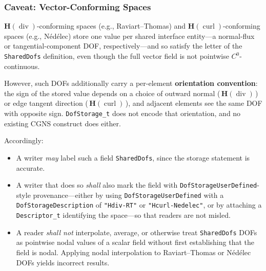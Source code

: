 \documentclass[11pt,letterpaper]{article}
\begin{document}
\subsubsection{Caveat: Vector-Conforming Spaces}
\label{sec:hdiv-hcurl}

$\boldsymbol{H}(\operatorname{div})$-conforming spaces
(e.g., Raviart--Thomas) and $\boldsymbol{H}(\operatorname{curl})$-conforming spaces
(e.g., N\'{e}d\'{e}lec) store one value per shared interface entity---a normal-flux
or tangential-component DOF, respectively---and so satisfy the letter of the
\texttt{SharedDofs} definition, even though the full vector field is not
pointwise $C^0$-continuous.

However, such DOFs additionally carry a per-element \textbf{orientation
convention}: the sign of the stored value depends on a choice of outward
normal (\,$\boldsymbol{H}(\operatorname{div})$\,) or edge tangent direction
(\,$\boldsymbol{H}(\operatorname{curl})$\,), and adjacent elements see the same
DOF with opposite sign.  \texttt{DofStorage\_t} does not encode that
orientation, and no existing CGNS construct does either.

Accordingly:

\begin{itemize}[leftmargin=2em]
\item A writer \emph{may} label such a field \texttt{SharedDofs}, since the
  storage statement is accurate.
\item A writer that does so \emph{shall} also mark the field with
  \texttt{DofStorageUserDefined}-style provenance---either by using
  \texttt{DofStorageUserDefined} with a
  \texttt{DofStorageDescription} of \texttt{"Hdiv-RT"} or
  \texttt{"Hcurl-Nedelec"}, or by attaching a
  \texttt{Descriptor\_t} identifying the space---so that readers are not
  misled.
\item A reader \emph{shall not} interpolate, average, or otherwise treat
  \texttt{SharedDofs} DOFs as pointwise nodal values of a scalar field
  without first establishing that the field is nodal.  Applying nodal
  interpolation to Raviart--Thomas or N\'{e}d\'{e}lec DOFs yields
  incorrect results.
\end{itemize}
\end{document}
